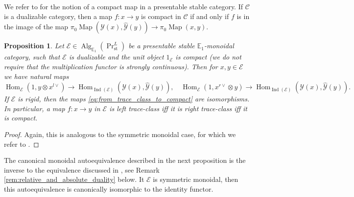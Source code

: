 \documentclass[11pt,leqno]{amsart}
\newtheorem{prop}[theo]{Proposition}
\numberwithin{equation}{section}
\def\Hom{\operatorname{Hom}}
\def\Map{\operatorname{Map}}
\newcommand{\st}{\operatorname{st}}
\newcommand{\bE}{{\mathbb E}}
\newcommand{\cC}{{\mathcal C}}
\newcommand{\cE}{{\mathcal E}}
\newcommand{\cY}{{\mathcal Y}}
\newcommand{\Ind}{\operatorname{Ind}}
\newcommand{\Alg}{\operatorname{Alg}}
\begin{document}
We refer to \cite[Section 1.8]{E24} for the notion of a compact map in a presentable stable category. If $\cC$ is a dualizable category, then a map $f:x\to y$ is compact in $\cC$ if and only if $f$ is in the image of the map $\pi_0\Map(\cY(x),\hat{\cY}(y))\to\pi_0\Map(x,y).$

\begin{prop}\cite{Ram24b}\label{prop:trace_class_iff_compact}
Let $\cE\in\Alg_{\bE_1}(\Pr^L_{\st})$ be a presentable stable $\bE_1$-monoidal category, such that $\cE$ is dualizable and the unit object $1_{\cE}$ is compact (we do not require that the multiplication functor is strongly continuous). Then for $x,y\in\cE$ we have natural maps
\begin{equation}\label{eq:from_trace_class_to_compact}
\Hom_{\cE}(1,y\otimes x^{l\vee})\to \Hom_{\Ind(\cE)}(\cY(x),\hat{\cY}(y)),\quad \Hom_{\cE}(1,x^{r\vee}\otimes y)\to \Hom_{\Ind(\cE)}(\cY(x),\hat{\cY}(y)).
\end{equation}
If $\cE$ is rigid, then the maps \eqref{eq:from_trace_class_to_compact} are isomorphisms. In particular, a map $f:x\to y$ in $\cE$ is left trace-class iff it is right trace-class iff it is compact.
\end{prop}

\begin{proof}
Again, this is analogous to the symmetric monoidal case, for which we refer to \cite[Corollary 4.52]{Ram24b}.
\end{proof}

The canonical monoidal autoequivalence described in the next proposition is the inverse to the equivalence discussed in \cite[Section 9.2.7]{GaRo17}, see Remark \ref{rem:relative_and_absolute_duality} below. It $\cE$ is symmetric monoidal, then this autoequivalence is canonically isomorphic to the identity functor.
\end{document}

